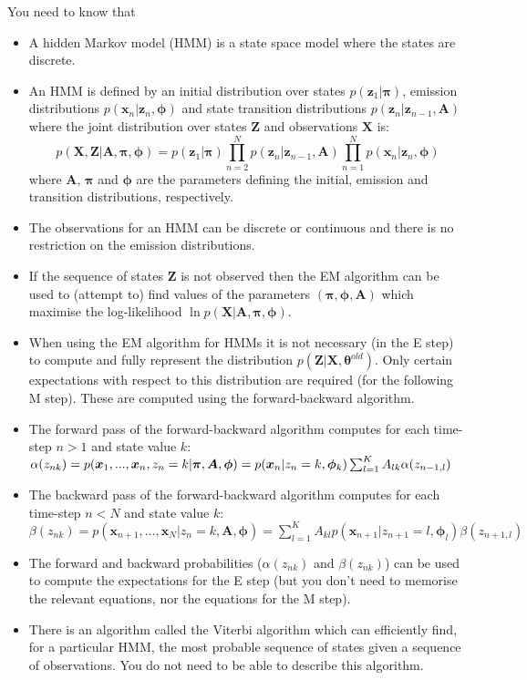 \documentclass{article}
\newcommand{\bs}{\boldsymbol}
\newcommand{\yntk}{You need to know}
\begin{document}
\yntk{} that
\begin{itemize}
\item A hidden Markov model (HMM) is a state space model where the states
  are discrete.
\item An HMM is defined by an initial distribution over states $p(\bs
  z_1 | \bs \pi)$, emission distributions $p(\bs x_n | \bs z_n,
  \bs\phi)$ and state transition distributions $p(\bs z_n | \bs
  z_{n-1}, \bs A)$ where the joint distribution over states $\bs Z$
  and observations $\bs X$ is:
\[  p(\bs X, \bs Z | \bs A, \bs \pi, \bs \phi) = p(\bs z_1 | \bs \pi) \prod_{n=2}^N p(\bs z_n | \bs z_{n-1}, \bs A) \prod_{n=1}^N p(\bs x_n | \bs z_n, \bs\phi)
\]
where $\bs A$, $\bs\pi$ and $\bs\phi$ are the parameters defining the
initial, emission and transition distributions, respectively.
\item The observations for an HMM can be discrete or continuous and
  there is no restriction on the emission distributions.
\item If the sequence of states $\bs Z$ is not observed then the EM
  algorithm can be used to (attempt to) find values of the parameters
  $(\bs \pi, \bs \phi, \bs A)$ which maximise the log-likelihood $\ln
  p(\bs X | \bs A, \bs\pi, \bs\phi)$.
\item When using the EM algorithm for HMMs it is not necessary (in the
  E step) to compute and fully represent the distribution
  $p(\bs Z|\bs X, \bs\theta^{old})$. Only certain expectations with
  respect to this distribution are required (for the following M
  step). These are computed using the forward-backward algorithm.
\item The forward pass of the forward-backward algorithm computes for each time-step $n>1$ and state value $k$: 
$\alpha(z_{nk})  = p(\bs x_1,...,\bs x_n, z_{n}=k | \bs\pi, \bs A, \bs\phi) \nonumber\\
=  p(\bs x_n | z_{n}=k, \bs\phi_k) \sum_{l=1}^K A_{lk}
\alpha(z_{n-1,l})$
\item The backward pass of the forward-backward algorithm computes for each time-step $n<N$ and state value $k$: $\beta(z_{nk})  = p(\bs x_{n+1},...,\bs x_N |  z_{n}=k, \bs A, \bs\phi )  
 = \sum_{l=1}^K A_{kl} p(\bs x_{n+1} | z_{n+1}=l, \bs\phi_l)  \beta(z_{n+1,l})
$
\item The forward and backward probabilities ($\alpha(z_{nk})$ and
  $\beta(z_{nk})$) can be used to compute the expectations for the E
  step (but you don't need to memorise the relevant equations, nor the
  equations for the M step).
\item There is an algorithm called the Viterbi algorithm which can
  efficiently find, for a particular HMM, the most probable sequence
  of states given a sequence of observations. You do not need to be
  able to describe this algorithm.
\end{itemize}
\end{document}
